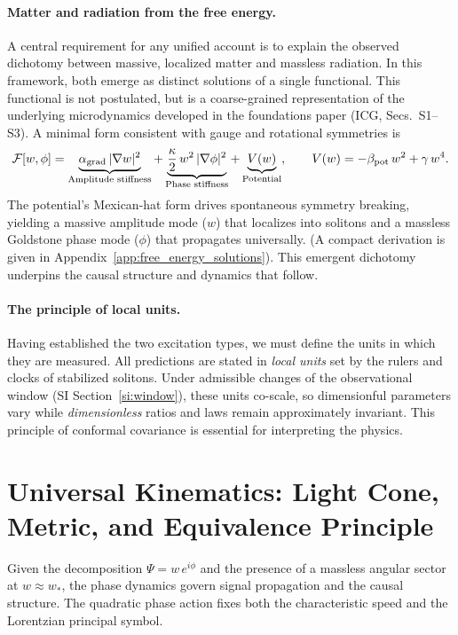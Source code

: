 \documentclass[11pt]{article}
\begin{document}
\paragraph{Matter and radiation from the free energy.}
A central requirement for any unified account is to explain the observed dichotomy between massive, localized matter and massless radiation. In this framework, both emerge as distinct solutions of a single functional. This functional is not postulated, but is a coarse-grained representation of the underlying microdynamics developed in the foundations paper (ICG, Secs.~S1–S3). A minimal form consistent with gauge and rotational symmetries is
\begin{equation}
  \mathcal F[w,\phi] = \underbrace{\alpha_{\rm grad}\,|\nabla w|^2}_{\text{Amplitude stiffness}} + \underbrace{\frac{\kappa}{2}\,w^2\,|\nabla\phi|^2}_{\text{Phase stiffness}} + \underbrace{V(w)}_{\text{Potential}},\qquad V(w) = -\beta_{\rm pot}\,w^2 + \gamma\,w^4.
\end{equation}
The potential's Mexican-hat form drives spontaneous symmetry breaking, yielding a massive amplitude mode ($w$) that localizes into solitons and a massless Goldstone phase mode ($\phi$) that propagates universally. (A compact derivation is given in Appendix~\ref{app:free_energy_solutions}). This emergent dichotomy underpins the causal structure and dynamics that follow.

\paragraph{The principle of local units.}
Having established the two excitation types, we must define the units in which they are measured. All predictions are stated in \emph{local units} set by the rulers and clocks of stabilized solitons. Under admissible changes of the observational window (SI Section~\ref{si:window}), these units co-scale, so dimensionful parameters vary while \emph{dimensionless} ratios and laws remain approximately invariant. This principle of conformal covariance is essential for interpreting the physics.

\section{Universal Kinematics: Light Cone, Metric, and Equivalence Principle}
Given the decomposition $\Psi=w\,e^{i\phi}$ and the presence of a massless angular sector at $w\approx w_*$, the phase dynamics govern signal propagation and the causal structure. The quadratic phase action fixes both the characteristic speed and the Lorentzian principal symbol.
\end{document}
